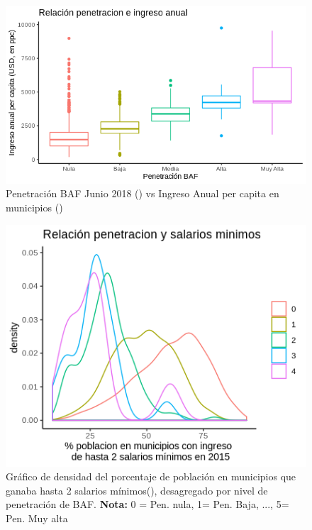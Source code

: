 \documentclass[9pt,twocolumn,twoside]{ilcss}
\begin{document}
\begin{appendices}
\begin{figure}[tbhp]
	\centering
	\includegraphics[width=1.0\linewidth]{images/pen_income.png}
	\caption{Penetración BAF Junio 2018 (\cite{IFT2019BIT}) vs Ingreso Anual per capita en municipios (\cite{ONU2015}) }
	\label{fig:pen_income}
\end{figure}

\begin{figure}[tbhp]
	\centering
	\includegraphics[width=1.0\linewidth]{images/pen_smm.png}
	\caption{Gráfico de densidad del porcentaje de población en municipios que ganaba hasta 2 salarios mínimos(\cite{CONAPO2015}), desagregado por nivel de penetración de BAF. \textbf{Nota:} 0 = Pen. nula, 1= Pen. Baja, ..., 5= Pen. Muy alta}
	\label{fig:pen_smm}
\end{figure}


\end{appendices}
\end{document}
